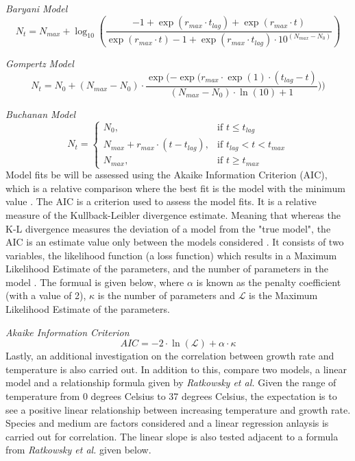 \documentclass[11pt]{article}
\begin{document}
\textit{Baryani Model}
\begin{equation*}
    N_t = N_{max} + \log_{10}(\frac{-1 + \exp(r_{max} \cdot t_{lag}) + \exp(r_{max} \cdot t)}{\exp(r_{max} \cdot t) - 1 + \exp(r_{max} \cdot t_{lag}) \cdot 10^(N_{max} - N_0)}) \label{eq:Baranyi Model} \tag{1.2}
\end{equation*}

\textit{Gompertz Model}
\begin{equation*}
    N_t =  N_0 + (N_{max} - N_0) \cdot \frac{\exp(-\exp(r_{max} \cdot \exp(1) \cdot (t_{lag} - t)}{(N_{max} - N_0) \cdot \ln(10) + 1})) \label{eq:Gompertz Model} \tag{1.3}
\end{equation*}

\textit{Buchanan Model}
\begin{equation*}
    N_t = \begin{cases}
          N_0, & \text{if } t\leq t_{lag}\\
          N_{max} + r_{max} \cdot (t - t_{lag}), & \text{if } t_{lag} < t < t_{max}\\
          N_{max}, & \text{if } t\geq t_{max}
          \end{cases} \label{eq:Buchanan Model} \tag{1.4}
\end{equation*}
Model fits be will be assessed using the Akaike Information Criterion (AIC), which is a relative comparison where the best fit is the model with the minimum value \cite{vrieze2012model,posada2004model}. The AIC is a criterion used to assess the model fits. It is a relative measure of the Kullback-Leibler divergence estimate. Meaning that whereas the K-L divergence measures the deviation of a model from the "true model", the AIC is an estimate value only between the models considered \cite{vrieze2012model}. It consists of two variables, the likelihood function (a loss function) which results in a Maximum Likelihood Estimate of the parameters, and the number of parameters in the model \cite{vrieze2012model}. The formual is given below, where $\alpha$ is known as the penalty coefficient (with a value of 2), $\kappa$ is the number of parameters and $\mathcal{L}$ is the Maximum Likelihood Estimate of the parameters.

\textit{Akaike Information Criterion}
\begin{equation*}
    AIC = -2 \cdot \ln{(\mathcal{L})} + \alpha \cdot \kappa \label{eq:AIC} \tag{2}
\end{equation*}
Lastly, an additional investigation on the correlation between growth rate and temperature is also carried out. In addition to this, compare two models, a linear model and a relationship formula given by \textit{Ratkowsky et al.} Given the range of temperature from 0 degrees Celsius to 37 degrees Celsius, the expectation is to see a positive linear relationship between increasing temperature and growth rate. Species and medium are factors considered and a linear regression anlaysis is carried out for correlation. The linear slope is also tested adjacent to a formula from \textit{Ratkowsky et al.} given below.
\end{document}
